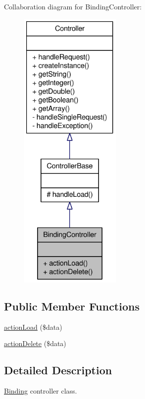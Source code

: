 Collaboration diagram for BindingController:\nopagebreak
\begin{figure}[H]
\begin{center}
\leavevmode
\includegraphics[height=400pt]{classBindingController__coll__graph}
\end{center}
\end{figure}
\subsection*{Public Member Functions}
\begin{DoxyCompactItemize}
\item 
\hyperlink{classBindingController_a3dc0beda70f711e9bc4fba67711ee7ee}{actionLoad} (\$data)
\item 
\hyperlink{classBindingController_a88ab9962fee0cae0a6df7f8f4dd4e56c}{actionDelete} (\$data)
\end{DoxyCompactItemize}


\subsection{Detailed Description}
\hyperlink{classBinding}{Binding} controller class. 

